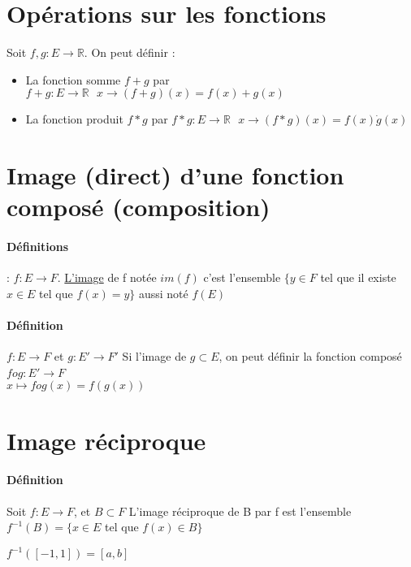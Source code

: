 \section{Opérations sur les fonctions}
Soit $f, g : E \rightarrow \mathbb{R}$. On peut définir :

\begin{itemize}
	\item La fonction somme $f+g$ par $f+g : E \rightarrow \mathbb{R} \text{ }
		x\rightarrow(f+g)(x) = f(x)+g(x)$
	\item La fonction produit $f*g$ par $f*g : E \rightarrow \mathbb{R} \text{ }
		x\rightarrow(f*g)(x) = f(x) \dot g(x)$
\end{itemize}

\section{Image (direct) d'une fonction composé (composition)}
\paragraph{Définitions} : $f:E \rightarrow F$. \ul{L'image} de f notée $im(f)$ c'est l'ensemble $\{y \in F$ tel que il existe $x \in E$ tel que $f(x) = y\}$ aussi noté $f(E)$

\paragraph{Définition} $f:E \rightarrow F$ et $g:E' \rightarrow F'$
Si l'image de $g \subset E$, on peut définir la fonction composé $f o g : E' \rightarrow F$ 
~\\
$x \mapsto f o g (x) = f(g(x))$

\section{Image réciproque} 
\paragraph{Définition} Soit $f:E \rightarrow F$, et $B \subset F$ L'image réciproque de B par f est l'ensemble  $f^{-1}(B) = \{x \in E$ tel que $f(x) \in B\}$

$f^{-1}([-1, 1]) = [a, b]$
